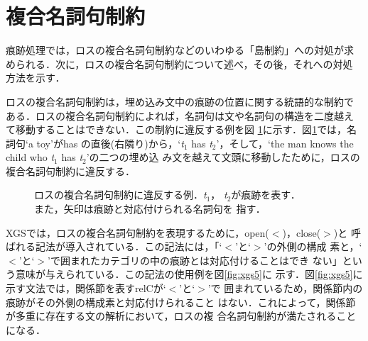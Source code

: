 \section{複合名詞句制約}

痕跡処理では，ロスの複合名詞句制約などのいわゆる「島制約」への対処が求
められる．次に，ロスの複合名詞句制約について述べ，その後，それへの対処
方法を示す．

ロスの複合名詞句制約は，埋め込み文中の痕跡の位置に関する統語的な制約で
ある．ロスの複合名詞句制約によれば，名詞句は文や名詞句の構造を二度越え
て移動することはできない\cite{Tanaka1989}．この制約に違反する例を図
\ref{fig:np_const}に示す．図\ref{fig:np_const}では，名詞句`a toy'がhas
の直後(右隣り)から，`{\it t$_{1}$} has {\it t$_{2}$}'，そして，`the
man knows the child who {\it t$_{1}$} has {\it t$_{2}$}'の二つの埋め込
み文を越えて文頭に移動したために，ロスの複合名詞句制約に違反する．

\begin{figure}[htbp]
  \begin{center}
    
    \caption{ロスの複合名詞句制約に違反する例．{\it t$_{1}$}，{\it
        t$_{2}$}が痕跡を表す．\\また，矢印は痕跡と対応付けられる名詞句を
        指す．}
    \label{fig:np_const}
  \end{center}
\end{figure}

XGSでは，ロスの複合名詞句制約を表現するために，open($<$)，close($>$)と
呼ばれる記法が導入されている．この記法には，「`$<$'と`$>$'の外側の構成
素と，`$<$'と`$>$'で囲まれたカテゴリの中の痕跡とは対応付けることはでき
ない」という意味が与えられている．この記法の使用例を図\ref{fig:xgs5}に
示す．図\ref{fig:xgs5}に示す文法では，関係節を表すrelCが`$<$'と`$>$'で
囲まれているため，関係節内の痕跡がその外側の構成素と対応付けられること
はない．これによって，関係節が多重に存在する文の解析において，ロスの複
合名詞句制約が満たされることになる．


